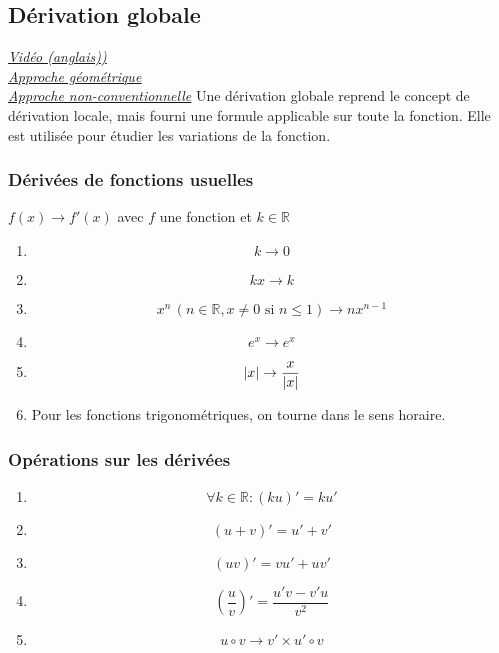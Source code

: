 \documentclass{article}
\begin{document}
\subsection{Dérivation globale}
\href{https://youtu.be/9vKqVkMQHKk}{\underline{\textit{Vidéo (anglais))}}}\\
\href{https://youtu.be/S0_qX4VJhMQ}{\underline{\textit{Approche géométrique}}}\\
\href{https://youtu.be/CfW845LNObM}{\underline{\textit{Approche non-conventionnelle}}}
\break
Une dérivation globale reprend le concept de dérivation locale, mais fourni une formule applicable sur toute la fonction. Elle est utilisée pour étudier les variations de la fonction.

\subsubsection{Dérivées de fonctions usuelles}
$f(x) \rightarrow f'(x)$ avec $f$ une fonction et $k\in\mathbb{R}$
\begin{enumerate}
	\item[] $$k \rightarrow 0$$
	\item[] $$kx \rightarrow k$$
	\item[] $$x^n \, (n\in\mathbb{R}, x\ne 0 \text{ si } n\le 1) \rightarrow nx^{n-1}$$
	\item[] $$e^x \rightarrow e^x$$
	\item[] $$\abs{x} \rightarrow \frac{x}{\abs{x}}$$
	\item[] \begin{center}Pour les fonctions trigonométriques, on tourne dans le sens horaire.\end{center}
\end{enumerate}

\subsubsection{Opérations sur les dérivées}
\begin{enumerate}
	\item[] $$\forall k \in \mathbb{R} : (ku)' = ku'$$
	\item[] $$(u+v)' = u' +v'$$
	\item[] $$(uv)' = vu' + uv'$$
	\item[] $$(\frac{u}{v})' = \frac{u'v-v'u}{v^2} $$
	\item[] $$u\circ v \rightarrow v'  \times u'\circ v$$
\end{enumerate}
\end{document}
